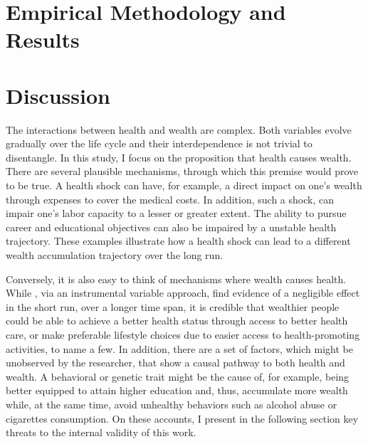 


\chapter{Empirical Methodology and Results}
\label{chap:empir_metho_res}








\chapter{Discussion}
\label{ch:discus}

The interactions between health and wealth are complex. Both variables evolve gradually over the life cycle and
their interdependence is not trivial to disentangle. In this study, I focus on the proposition that health causes
wealth. There are several plausible mechanisms, through which this premise would prove to be true. A health shock
can have, for example, a direct impact on one's wealth through expenses to cover the medical costs. In addition,
such a shock, can impair one's labor capacity to a lesser or greater extent. The ability to pursue career and
educational objectives can also be impaired by a unstable health trajectory. These examples illustrate how a health
shock can lead to a different wealth accumulation trajectory over the long run.

Conversely, it is also easy to think of mechanisms where wealth causes health. While
\textcite{meer.etal2003exploring}, via an instrumental variable approach, find evidence of a negligible effect in
the short run, over a longer time span, it is credible that wealthier people could be able to achieve a better
health status through access to better health care, or make preferable lifestyle choices due to easier access to
health-promoting  activities, to name a few. In addition, there are a set of factors, which might be unobserved by
the researcher, that show a causal pathway to both health and wealth. A behavioral or genetic trait might be the
cause of, for example, being better equipped to attain higher education and, thus, accumulate more wealth while, at
the same time, avoid unhealthy behaviors such as alcohol abuse or cigarettes consumption. On these accounts, I
present in the following section key threats to the internal validity of this work.


